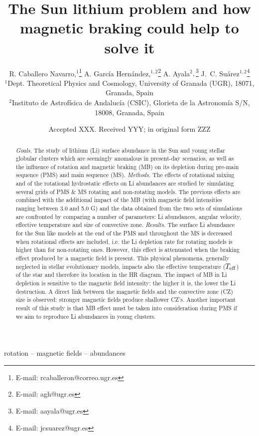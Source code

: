 \documentclass[fleqn,usenatbib]{mnras}
\title[Rotation, magnetic braking \& Li abundances]{The Sun lithium problem and how magnetic braking could help to solve it}
\author[R. Caballero Navarro et al.]{
R. Caballero Navarro,$^{1}$\thanks{E-mail: rcaballeron@correo.ugr.es}
A. Garc\'ia Hern\'andez,$^{1,2}$\thanks{E-mail: agh@ugr.es}
A. Ayala$^{2},$\thanks{E-mail: aayala@ugr.es}
J.~C. Su\'arez$^{1,2}$\thanks{E-mail: jcsuarez@ugr.es}
\\
$^{1}$Dept. Theoretical Physics and Cosmology, University of Granada (UGR), 18071, Granada, Spain\\
$^{2}$Instituto de Astrof\'isica de Andaluc\'ia (CSIC), Glorieta de la Astronom\'ia S/N, 18008, Granada, Spain\\
}
\date{Accepted XXX. Received YYY; in original form ZZZ}
\begin{document}
\label{firstpage}
\pagerange{\pageref{firstpage}--\pageref{lastpage}}
\maketitle

\begin{abstract}
\textit{Goals.} The study of lithium (Li) surface abundance in the Sun and young stellar globular clusters which are seemingly anomalous in present-day scenarios, as well as the influence of rotation and magnetic braking (MB) on its depletion during pre-main sequence (PMS) and main sequence (MS).
\newline\textit{Methods.} The effects of rotational mixing and of the rotational hydrostatic effects on Li abundances are studied by simulating several grids of PMS \& MS rotating and non-rotating models. The previous effects are combined with the additional impact of the MB (with magnetic field intensities ranging between 3.0 and 5.0 G) and the data obtained from the two sets of simulations are confronted by comparing a number of parameters: Li abundances, angular velocity, effective temperature and size of convective zone.
\newline\textit{Results.} The surface Li abundance for the Sun like models at the end of the PMS and throughout the MS is decreased when rotational effects are included, i.e. the Li depletion rate for rotating models is higher than for non-rotating ones. However, this effect is attenuated when the braking effect produced by a magnetic field is present. This physical phenomena, generally neglected in stellar evolutionary models, impacts also the effective temperature ($T_{\mathrm{eff}}$) of the star and therefore its location in the HR diagram. The impact of MB in Li depletion is sensitive to the magnetic field intensity: the higher it is, the lower the Li destruction. A direct link between the magnetic fields and the convective zone (CZ) size is observed: stronger magnetic fields produce shallower CZ's. Another important result of this study is that MB effect must be taken into consideration during PMS if we aim to reproduce Li abundances in young clusters.
\end{abstract}

\begin{keywords}
rotation -- magnetic fields -- abundances
\end{keywords}
\end{document}
